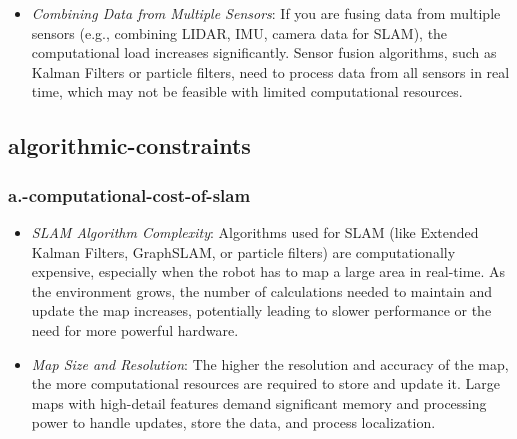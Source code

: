 \documentclass[../../main]{subfiles}
\begin{document}
    \begin{itemize}
    \item
      \emph{Combining Data from Multiple Sensors}: If you are fusing data
      from multiple sensors (e.g., combining LIDAR, IMU, camera data for
      SLAM), the computational load increases significantly. Sensor fusion
      algorithms, such as Kalman Filters or particle filters, need to
      process data from all sensors in real time, which may not be feasible
      with limited computational resources.
    \end{itemize}
    
    \subsection{algorithmic-constraints}
    
    \subsubsection{a.-computational-cost-of-slam}

    \begin{itemize}
    \item
      \emph{SLAM Algorithm Complexity}: Algorithms used for SLAM (like
      Extended Kalman Filters, GraphSLAM, or particle filters) are
      computationally expensive, especially when the robot has to map a
      large area in real-time. As the environment grows, the number of
      calculations needed to maintain and update the map increases,
      potentially leading to slower performance or the need for more
      powerful hardware.
    \item
      \emph{Map Size and Resolution}: The higher the resolution and
      accuracy of the map, the more computational resources are required to
      store and update it. Large maps with high-detail features demand
      significant memory and processing power to handle updates, store the
      data, and process localization.
    \end{itemize}
    
\end{document}
